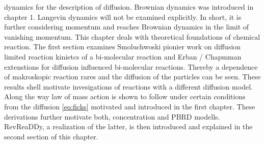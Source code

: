 \documentclass[
  a4paper,BCOR10mm,oneside,
  bibtotoc,idxtotoc,
  headsepline,footsepline,%
  fleqn,openbib
]{scrbook}
\begin{document}
dynamics for the description of diffusion. Brownian dynamics was introduced in chapter 1. Langevin dynamics will not be examined explicitly. In short, it is further considering momentum and reaches Brownian dynamics in the limit of vanishing momentum.\newline
This chapter deals with theoretical foundations of chemical reaction. The first section examines Smoluchwoski pionier work on diffusion limited reaction kinietcs of a bi-molecular reaction and Erban / Chapmman extenstions \cite{Erban2009} for diffusion influenced bi-molecular reactions. Thereby a dependence of makroskopic reaction rares and the diffusion of the particles can be seen. These results shell motivate invesigations of reactions with a different diffusion model. Along the way law of mass action is shown to follow  under certain conditions from the diffusion \cref{eq:ficks} motivated and introduced in the first chapter. These derivations further motivate both, concentration and PBRD modells. RevReaDDy, a realization of the latter, is then introduced and explained in the second section of this chapter.
\end{document}
